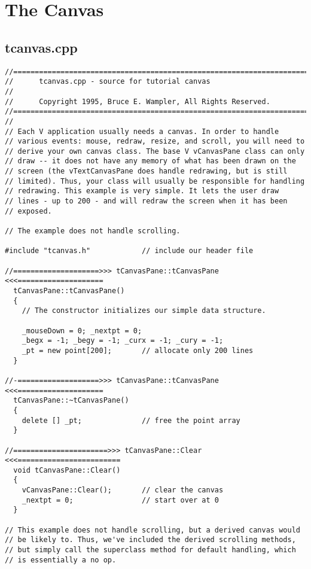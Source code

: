 \section{The Canvas}

\subsection*{tcanvas.cpp}

%
\footnotesize
\begin{verbatim}
//========================================================================
//      tcanvas.cpp - source for tutorial canvas
//
//      Copyright 1995, Bruce E. Wampler, All Rights Reserved.
//========================================================================
//
// Each V application usually needs a canvas. In order to handle
// various events: mouse, redraw, resize, and scroll, you will need to
// derive your own canvas class. The base V vCanvasPane class can only
// draw -- it does not have any memory of what has been drawn on the
// screen (the vTextCanvasPane does handle redrawing, but is still
// limited). Thus, your class will usually be responsible for handling
// redrawing. This example is very simple. It lets the user draw
// lines - up to 200 - and will redraw the screen when it has been
// exposed.

// The example does not handle scrolling.

#include "tcanvas.h"            // include our header file

//====================>>> tCanvasPane::tCanvasPane <<<====================
  tCanvasPane::tCanvasPane()
  {
    // The constructor initializes our simple data structure.

    _mouseDown = 0; _nextpt = 0;
    _begx = -1; _begy = -1; _curx = -1; _cury = -1;
    _pt = new point[200];       // allocate only 200 lines
  }

//-===================>>> tCanvasPane::tCanvasPane <<<====================
  tCanvasPane::~tCanvasPane()
  {
    delete [] _pt;              // free the point array
  }

//======================>>> tCanvasPane::Clear <<<========================
  void tCanvasPane::Clear()
  {
    vCanvasPane::Clear();       // clear the canvas
    _nextpt = 0;                // start over at 0
  }

// This example does not handle scrolling, but a derived canvas would
// be likely to. Thus, we've included the derived scrolling methods,
// but simply call the superclass method for default handling, which
// is essentially a no op.


\end{verbatim}
